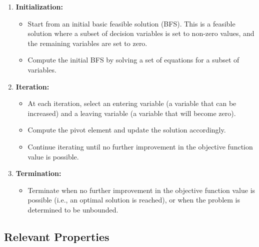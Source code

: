 \documentclass[a4paper]{article}
\begin{document}
\begin{enumerate}
    \item \textbf{Initialization:}
    \begin{itemize}
        \item Start from an initial basic feasible solution (BFS). This is a feasible solution where a subset of decision variables is set to non-zero values, and the remaining variables are set to zero.
        \item Compute the initial BFS by solving a set of equations for a subset of variables.
    \end{itemize}
    
    \item \textbf{Iteration:}
    \begin{itemize}
        \item At each iteration, select an entering variable (a variable that can be increased) and a leaving variable (a variable that will become zero).
        \item Compute the pivot element and update the solution accordingly.
        \item Continue iterating until no further improvement in the objective function value is possible.
    \end{itemize}
    
    \item \textbf{Termination:}
    \begin{itemize}
        \item Terminate when no further improvement in the objective function value is possible (i.e., an optimal solution is reached), or when the problem is determined to be unbounded.
    \end{itemize}
\end{enumerate}

\subsection{Relevant Properties}
\end{document}
